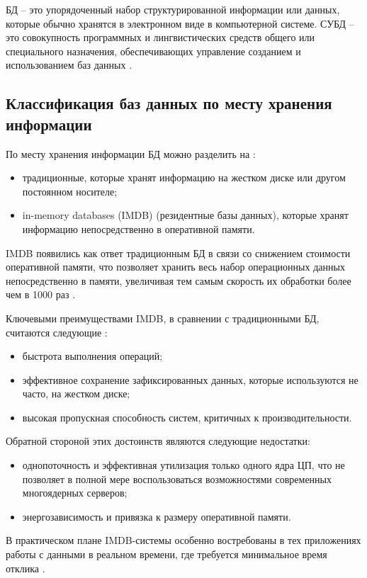 БД -- это упорядоченный набор структурированной информации или данных, которые обычно хранятся в электронном виде в компьютерной системе. СУБД -- это совокупность программных и лингвистических средств общего или специального назначения, обеспечивающих управление созданием и использованием баз данных \cite{database}.

\subsection{Классификация баз данных по месту хранения информации}

По месту хранения информации БД можно разделить на \cite{inmemory}:
\begin{itemize}
	\item традиционные, которые хранят информацию на жестком диске или другом постоянном носителе; 
	\item in-memory databases (IMDB) (резидентные базы данных), которые хранят информацию непосредственно в оперативной памяти.
\end{itemize}

IMDB появились как ответ традиционным БД в связи со снижением стоимости оперативной памяти, что позволяет хранить весь набор операционных данных непосредственно в памяти, увеличивая тем самым скорость их обработки более чем в 1000 раз \cite{why}.

Ключевыми преимуществами IMDB, в сравнении с традиционными БД, считаются следующие \cite{adv}:

\begin{itemize}
	\item быстрота выполнения операций;
	\item эффективное сохранение зафиксированных данных, которые используются не часто, на жестком диске;
	\item высокая пропускная способность систем, критичных к производительности.
\end{itemize}

Обратной стороной этих достоинств являются следующие недостатки:
\begin{itemize}
	\item однопоточность и эффективная утилизация только одного ядра ЦП, что не позволяет в полной мере воспользоваться возможностями современных многоядерных серверов;
	\item энергозависимость и привязка к размеру оперативной памяти.
\end{itemize}

В практическом плане IMDB-системы особенно востребованы в тех приложениях работы с данными в реальном времени, где требуется минимальное время отклика \cite{lookslike}.

